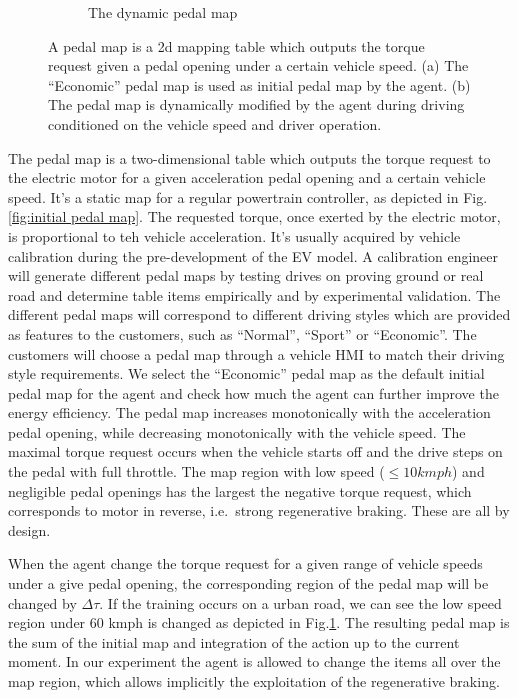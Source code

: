 \documentclass{article}
\begin{document}
\begin{figure}[ht]
\begin{subfigure}[b]{0.45\textwidth}
		\caption{The dynamic pedal map}\label{fig:dynamic pedal map}
	\end{subfigure}
	\caption{\label{fig:pedal map} A pedal map is a 2d mapping table which outputs the torque request given a pedal opening under a certain vehicle speed. (a) The ``Economic'' pedal map is used as initial pedal map by the agent. (b) The pedal map is dynamically modified by the agent during driving conditioned on the vehicle speed and driver operation.}
\end{figure}

The pedal map is a two-dimensional table which outputs the torque request to the electric motor for a given acceleration pedal opening and a certain vehicle speed. It's a static map for a regular powertrain controller, as depicted in Fig.\@\ref{fig:initial pedal map}. The requested torque, once exerted by the electric motor, is proportional to teh vehicle acceleration. It's usually acquired by vehicle calibration during the pre-development of the EV model. A calibration engineer will generate different pedal maps by testing drives on proving ground or real road and determine table items empirically and by experimental validation. The different pedal maps will correspond to different driving styles which are provided as features to the customers, such as ``Normal'', ``Sport'' or ``Economic''. The customers will choose a pedal map through a vehicle HMI to match their driving style requirements. We select the ``Economic'' pedal map as the default initial pedal map for the agent and check how much the agent can further improve the energy efficiency. The pedal map increases monotonically with the acceleration pedal opening, while decreasing monotonically with the vehicle speed. The maximal torque request occurs when the vehicle starts off and the drive steps on the pedal with full throttle. The map region with low speed ($\leq10kmph$) and negligible pedal openings has the largest the negative torque request, which corresponds to motor in reverse, i.e.\ strong regenerative braking. These are all by design.

When the agent change the torque request for a given range of vehicle speeds under a give pedal opening, the corresponding region of the pedal map will be changed by $\Delta\tau$. If the training occurs on a urban road, we can see the low speed region under 60 kmph is changed as depicted in Fig.\ref{fig:dynamic pedal map}. The resulting pedal map is the sum of the initial map and integration of the action up to the current moment. In our experiment the agent is allowed to change the items all over the map region, which allows implicitly the exploitation of the regenerative braking.
\end{document}

